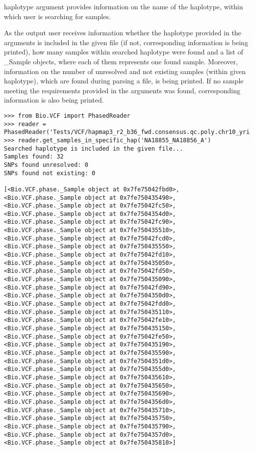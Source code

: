 \noindent haplotype argument provides information on the name of the haplotype, within which user is searching for samples.

\noindent As the output user receives information whether the haplotype provided in the arguments is included in the given file (if not, corresponding information 
is being printed), how many samples within searched haplotype were found and a list of _Sample objects, where each of them represents one found sample. Moreover, 
information on the number of unresolved and not existing samples (within given haplotype), which are found during parsing a file, is being printed. If no sample 
meeting the requirements provided in the arguments was found, corresponding information is also being printed.

\begin{verbatim}
>>> from Bio.VCF import PhasedReader
>>> reader = PhasedReader('Tests/VCF/hapmap3_r2_b36_fwd.consensus.qc.poly.chr10_yri.D.phased')
>>> reader.get_samples_in_specific_hap('NA18855_NA18856_A')
Searched haplotype is included in the given file...
Samples found: 32
SNPs found unresolved: 0
SNPs found not existing: 0

[<Bio.VCF.phase._Sample object at 0x7fe75042fbd0>, <Bio.VCF.phase._Sample object at 0x7fe750435490>, <Bio.VCF.phase._Sample object at 0x7fe75042fc50>, <Bio.VCF.phase._Sample object at 0x7fe7504354d0>, <Bio.VCF.phase._Sample object at 0x7fe75042fc90>, <Bio.VCF.phase._Sample object at 0x7fe750435510>, <Bio.VCF.phase._Sample object at 0x7fe75042fcd0>, <Bio.VCF.phase._Sample object at 0x7fe750435550>, <Bio.VCF.phase._Sample object at 0x7fe75042fd10>, <Bio.VCF.phase._Sample object at 0x7fe750435050>, <Bio.VCF.phase._Sample object at 0x7fe75042fd50>, <Bio.VCF.phase._Sample object at 0x7fe750435090>, <Bio.VCF.phase._Sample object at 0x7fe75042fd90>, <Bio.VCF.phase._Sample object at 0x7fe7504350d0>, <Bio.VCF.phase._Sample object at 0x7fe75042fdd0>, <Bio.VCF.phase._Sample object at 0x7fe750435110>, <Bio.VCF.phase._Sample object at 0x7fe75042fe10>, <Bio.VCF.phase._Sample object at 0x7fe750435150>, <Bio.VCF.phase._Sample object at 0x7fe75042fe50>, <Bio.VCF.phase._Sample object at 0x7fe750435190>, <Bio.VCF.phase._Sample object at 0x7fe750435590>, <Bio.VCF.phase._Sample object at 0x7fe7504351d0>, <Bio.VCF.phase._Sample object at 0x7fe7504355d0>, <Bio.VCF.phase._Sample object at 0x7fe750435610>, <Bio.VCF.phase._Sample object at 0x7fe750435650>, <Bio.VCF.phase._Sample object at 0x7fe750435690>, <Bio.VCF.phase._Sample object at 0x7fe7504356d0>, <Bio.VCF.phase._Sample object at 0x7fe750435710>, <Bio.VCF.phase._Sample object at 0x7fe750435750>, <Bio.VCF.phase._Sample object at 0x7fe750435790>, <Bio.VCF.phase._Sample object at 0x7fe7504357d0>, <Bio.VCF.phase._Sample object at 0x7fe750435810>]
\end{verbatim}

